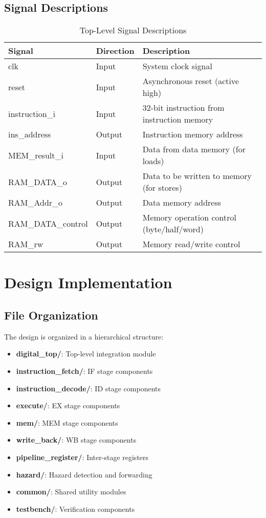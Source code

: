 \documentclass[11pt,a4paper]{article}
\begin{document}
\subsection{Signal Descriptions}

\begin{table}[h]
\centering
\begin{tabularx}{\textwidth}{|l|l|X|}
\hline
\textbf{Signal} & \textbf{Direction} & \textbf{Description} \\
\hline
clk & Input & System clock signal \\
\hline
reset & Input & Asynchronous reset (active high) \\
\hline
instruction\_i & Input & 32-bit instruction from instruction memory \\
\hline
ins\_address & Output & Instruction memory address \\
\hline
MEM\_result\_i & Input & Data from data memory (for loads) \\
\hline
RAM\_DATA\_o & Output & Data to be written to memory (for stores) \\
\hline
RAM\_Addr\_o & Output & Data memory address \\
\hline
RAM\_DATA\_control & Output & Memory operation control (byte/half/word) \\
\hline
RAM\_rw & Output & Memory read/write control \\
\hline
\end{tabularx}
\caption{Top-Level Signal Descriptions}
\end{table}

\section{Design Implementation}

\subsection{File Organization}
The design is organized in a hierarchical structure:

\begin{itemize}
    \item \textbf{digital\_top/}: Top-level integration module
    \item \textbf{instruction\_fetch/}: IF stage components
    \item \textbf{instruction\_decode/}: ID stage components  
    \item \textbf{execute/}: EX stage components
    \item \textbf{mem/}: MEM stage components
    \item \textbf{write\_back/}: WB stage components
    \item \textbf{pipeline\_register/}: Inter-stage registers
    \item \textbf{hazard/}: Hazard detection and forwarding
    \item \textbf{common/}: Shared utility modules
    \item \textbf{testbench/}: Verification components
\end{itemize}
\end{document}
